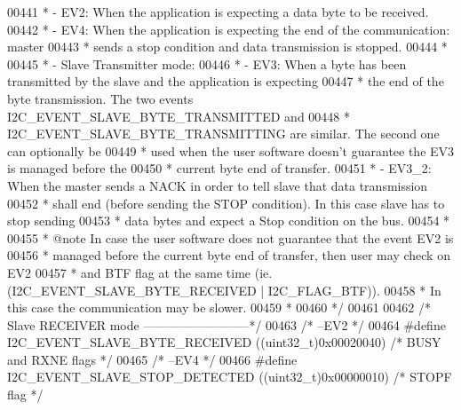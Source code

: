\begin{DoxyCode}
00441 \textcolor{comment}{  *     - EV2: When the application is expecting a data byte to be received. }
00442 \textcolor{comment}{  *     - EV4: When the application is expecting the end of the communication: master }
00443 \textcolor{comment}{  *       sends a stop condition and data transmission is stopped.}
00444 \textcolor{comment}{  *    }
00445 \textcolor{comment}{  * - Slave Transmitter mode:}
00446 \textcolor{comment}{  *    - EV3: When a byte has been transmitted by the slave and the application is expecting }
00447 \textcolor{comment}{  *      the end of the byte transmission. The two events I2C\_EVENT\_SLAVE\_BYTE\_TRANSMITTED and}
00448 \textcolor{comment}{  *      I2C\_EVENT\_SLAVE\_BYTE\_TRANSMITTING are similar. The second one can optionally be }
00449 \textcolor{comment}{  *      used when the user software doesn't guarantee the EV3 is managed before the}
00450 \textcolor{comment}{  *      current byte end of transfer.}
00451 \textcolor{comment}{  *    - EV3\_2: When the master sends a NACK in order to tell slave that data transmission }
00452 \textcolor{comment}{  *      shall end (before sending the STOP condition). In this case slave has to stop sending }
00453 \textcolor{comment}{  *      data bytes and expect a Stop condition on the bus.}
00454 \textcolor{comment}{  *      }
00455 \textcolor{comment}{  *  @note In case the  user software does not guarantee that the event EV2 is }
00456 \textcolor{comment}{  *        managed before the current byte end of transfer, then user may check on EV2 }
00457 \textcolor{comment}{  *        and BTF flag at the same time (ie. (I2C\_EVENT\_SLAVE\_BYTE\_RECEIVED | I2C\_FLAG\_BTF)).}
00458 \textcolor{comment}{  *        In this case the communication may be slower.}
00459 \textcolor{comment}{  *}
00460 \textcolor{comment}{  */}
00461 
00462 \textcolor{comment}{/* Slave RECEIVER mode --------------------------*/}
00463 \textcolor{comment}{/* --EV2 */}
00464 \textcolor{preprocessor}{#}\textcolor{preprocessor}{define}  \textcolor{preprocessor}{I2C\_EVENT\_SLAVE\_BYTE\_RECEIVED}                     \textcolor{preprocessor}{(}\textcolor{preprocessor}{(}\textcolor{preprocessor}{uint32\_t}\textcolor{preprocessor}{)}0x00020040\textcolor{preprocessor}{)}  \textcolor{comment}{/* BUSY and RXNE
       flags */}
00465 \textcolor{comment}{/* --EV4  */}
00466 \textcolor{preprocessor}{#}\textcolor{preprocessor}{define}  \textcolor{preprocessor}{I2C\_EVENT\_SLAVE\_STOP\_DETECTED}                     \textcolor{preprocessor}{(}\textcolor{preprocessor}{(}\textcolor{preprocessor}{uint32\_t}\textcolor{preprocessor}{)}0x00000010\textcolor{preprocessor}{)}  \textcolor{comment}{/* STOPF flag */}

\end{DoxyCode}
